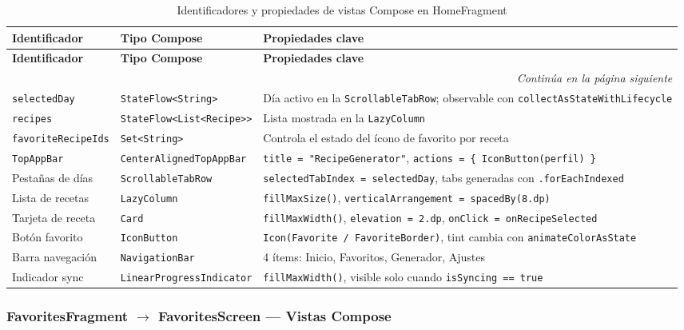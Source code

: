 \documentclass[stu, 12pt, letterpaper, donotrepeattitle, floatsintext, natbib]{apa7}
\begin{document}
\begin{longtable}{@{}p{2.5cm}p{4cm}p{9cm}@{}}
\caption{Identificadores y propiedades de vistas Compose en HomeFragment}
\label{tab:idhome}\\
\toprule
\textbf{Identificador} & \textbf{Tipo Compose} & \textbf{Propiedades clave} \\
\midrule
\endfirsthead
\toprule
\textbf{Identificador} & \textbf{Tipo Compose} & \textbf{Propiedades clave} \\
\midrule
\endhead
\midrule
\multicolumn{3}{r}{\small\textit{Continúa en la página siguiente}}\\
\endfoot
\bottomrule
\endlastfoot
\texttt{selectedDay} & \texttt{StateFlow<String>} & Día activo en la \texttt{ScrollableTabRow}; observable con \texttt{collectAsStateWithLifecycle} \\[3pt]
\texttt{recipes} & \texttt{StateFlow<List<Recipe>{}>} & Lista mostrada en la \texttt{LazyColumn} \\[3pt]
\texttt{favoriteRecipeIds} & \texttt{Set<String>} & Controla el estado del ícono de favorito por receta \\[3pt]
\texttt{TopAppBar} & \texttt{CenterAlignedTopAppBar} & \texttt{title = "RecipeGenerator"}, \texttt{actions = \{ IconButton(perfil) \}} \\[3pt]
Pestañas de días & \texttt{ScrollableTabRow} & \texttt{selectedTabIndex = selectedDay}, tabs generadas con \texttt{.forEachIndexed} \\[3pt]
Lista de recetas & \texttt{LazyColumn} & \texttt{fillMaxSize()}, \texttt{verticalArrangement = spacedBy(8.dp)} \\[3pt]
Tarjeta de receta & \texttt{Card} & \texttt{fillMaxWidth()}, \texttt{elevation = 2.dp}, \texttt{onClick = onRecipeSelected} \\[3pt]
Botón favorito & \texttt{IconButton} & \texttt{Icon(Favorite / FavoriteBorder)}, tint cambia con \texttt{animateColorAsState} \\[3pt]
Barra navegación & \texttt{NavigationBar} & 4 ítems: Inicio, Favoritos, Generador, Ajustes \\[3pt]
Indicador sync & \texttt{LinearProgressIndicator} & \texttt{fillMaxWidth()}, visible solo cuando \texttt{isSyncing == true} \\
\end{longtable}

\subsubsection{FavoritesFragment $\rightarrow$ FavoritesScreen --- Vistas Compose}
\end{document}

